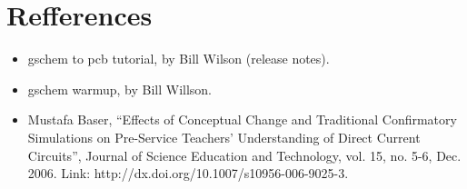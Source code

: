 \documentclass{report}
\begin{document}
\section{Refferences}
\begin{itemize}
\item gschem to pcb tutorial, by Bill Wilson (release notes).\newline
\hfill \break
\item gschem warmup, by Bill Willson.\newline
\hfill \break
\item Mustafa Baser, “Effects of Conceptual Change and Traditional Confirmatory Simulations on Pre-Service Teachers’ Understanding of Direct Current Circuits”, Journal of Science Education and Technology, vol. 15, no. 5-6, Dec. 2006. Link: http://dx.doi.org/10.1007/s10956-006-9025-3.
\end{itemize}
\end{document}
